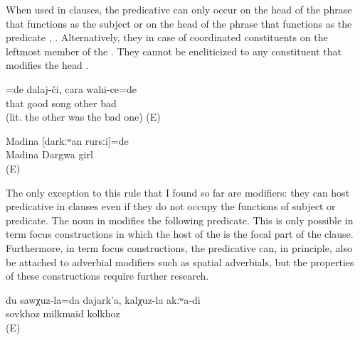 When used in  clauses, the predicative  can only occur on the head of the phrase that functions as the subject  or on the head of the phrase that functions as the  predicate , . Alternatively, they in case of coordinated constituents on the leftmost member of the  . They cannot be encliticized to any constituent that modifies the head . 
%
\begin{exe}
	\ex	\label{ex:‎The good one was a singer, not the bad one}
	\gll	[it	ʡaˁħ-ce]=de	dalaj-či,	cara	wahi-ce=de\\
		that	good	song	other	bad\\
	\glt	{} (lit. the other was the bad one) (E)

	\ex	\label{ex:‎‎‎Madina was a Dargwa girl}
	\begin{xlist}
		\ex	\label{ex:‎‎‎Madina was a Dargwa girl@A}
		\gll	Madina	[darkːʷan	rursːi]=de\\
			Madina	Dargwa	girl\\
		\glt	{} (E)

		 \label{ex:‎‎‎Madina was a Dargwa girl@B}
	\end{xlist}
\end{exe}

The only exception to this rule that I found so far are  modifiers: they can host predicative  in  clauses even if they do not occupy the functions of  subject or  predicate. The  noun in  modifies the following  predicate. This is only possible in term focus constructions in which the host of the  is the focal part of the clause. Furthermore, in term focus constructions, the predicative  can, in principle, also be attached to adverbial modifiers such as spatial adverbials, but the properties of these constructions require further research.
%
\begin{exe}
	\ex	\label{ex:‎I am milkmaid of the SOVKHOZ, not of the kolkhoz}
	\gll	du	sawχuz-la=da	dajark'a,	kalχuz-la	akːʷa-di\\
			sovkhoz	milkmaid	kolkhoz	\\
	\glt	{} (E)
\end{exe}

